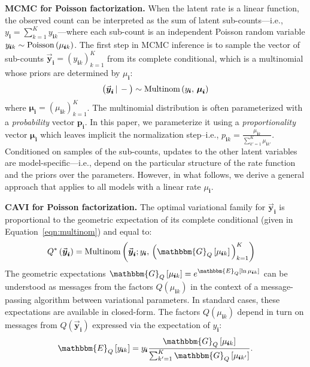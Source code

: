 \documentclass{article}
\newcommand{\subs}{\pmb{i}}
\newcommand{\ysk}{y_{\subs k}}
\newcommand{\ys}{y_{\subs}}
\newcommand{\mus}{\mu_{\subs}}
\newcommand{\musk}{\mu_{\subs k}}
\newcommand{\yvs}{\vec{\boldsymbol{y}}_{\subs}}
\newcommand{\Multi}[1]{\textup{Multinom}\left( #1 \right)}
\newcommand{\Pois}[1]{\textup{Poisson}\left( #1 \right)}
\newcommand{\Eq}[1]{\mathbbm{E}_Q\left[#1\right]}
\newcommand{\Gq}[1]{\mathbbm{G}_Q\left[#1\right]}
\newcommand{\given}{\,|\,}
\newcommand{\teq}{\!=\!}
\newcommand{\compcond}[1]{\big(#1\given-\big)}
\begin{document}
  \textbf{MCMC for Poisson factorization.} When the latent rate is a linear
  function, the observed count can be interpreted as the sum of latent
  sub-counts---i.e., $\ys = \sum_{k=1}^K \ysk$---where each sub-count is an
  independent Poisson random variable $\ysk \sim \Pois{\musk}$. The first step
  in MCMC inference is to sample the vector of sub-counts $\yvs \teq
  \left(\ysk\right)_{k=1}^K$ from its complete conditional, which is a
  multinomial whose priors are determined by $\mus$:
  \begin{equation}
  \label{eqn:multinom}
  \compcond{\yvs} \sim \Multi{\ys,\, \boldsymbol{\mu}_{\subs}}
  \end{equation}
  where $\boldsymbol{\mu}_{\subs}\teq \left(\musk\right)_{k=1}^K$. The
  multinomial distribution is often parameterized with a \emph{probability}
  vector $\boldsymbol{p}_{\subs}$. In this paper, we parameterize it using a
  \emph{proportionality} vector $\boldsymbol{\mu}_{\subs}$ which leaves implicit
  the normalization step--i.e., $p_{\subs k} = \frac{\musk}{\sum_{k'=1}^K
  \mu_{\subs k'}}$. Conditioned on samples of the sub-counts, updates to the
  other latent variables are model-specific---i.e., depend on the particular
  structure of the rate function and the priors over the parameters. However, in
  what follows, we derive a general approach that applies to all models with a
  linear rate $\mus$. 
  
  \textbf{CAVI for Poisson factorization.} The optimal variational family for
  $\yvs$ is proportional to the geometric expectation of its complete
  conditional (given in Equation~\ref{eqn:multinom}) and equal to:
  \begin{align}
  Q^*\left(\yvs\right) 
  &= \Multi{\yvs; \ys,\, \Big(\Gq{\musk}\Big)_{k=1}^K}
  \end{align}
  The geometric expectations $\Gq{\musk} = e^{\Eq{\ln \musk}}$ can be understood
  as messages from the factors $Q(\musk)$ in the context of a message-passing
  algorithm between variational parameters. In standard cases, these
  expectations are available in closed-form. The factors $Q(\musk)$ depend in
  turn on messages from $Q(\yvs)$ expressed via the expectation of $\ys$:
  \begin{equation}
      \Eq{\ysk}=\ys\frac{\Gq{\musk}}{\sum_{k'=1}^K \Gq{\mu_{\subs k'}}}.
  \end{equation}
  
\end{document}
